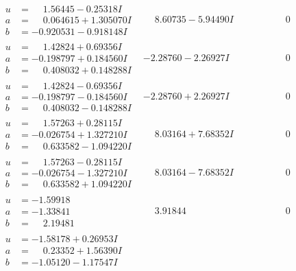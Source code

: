 \documentclass[1p]{elsarticle_modified}
\theoremstyle{definition}
\begin{document}
$$\begin{array}{c|c|c}
\begin{aligned}
u &= \phantom{-}1.56445 - 0.25318 I \\
a &= \phantom{-}0.064615 + 1.305070 I \\
b &= -0.920531 - 0.918148 I\end{aligned}
 & \phantom{-}8.60735 - 5.94490 I & \phantom{-0.000000 } 0 \\ \hline\begin{aligned}
u &= \phantom{-}1.42824 + 0.69356 I \\
a &= -0.198797 + 0.184560 I \\
b &= \phantom{-}0.408032 + 0.148288 I\end{aligned}
 & -2.28760 - 2.26927 I & \phantom{-0.000000 } 0 \\ \hline\begin{aligned}
u &= \phantom{-}1.42824 - 0.69356 I \\
a &= -0.198797 - 0.184560 I \\
b &= \phantom{-}0.408032 - 0.148288 I\end{aligned}
 & -2.28760 + 2.26927 I & \phantom{-0.000000 } 0 \\ \hline\begin{aligned}
u &= \phantom{-}1.57263 + 0.28115 I \\
a &= -0.026754 + 1.327210 I \\
b &= \phantom{-}0.633582 - 1.094220 I\end{aligned}
 & \phantom{-}8.03164 + 7.68352 I & \phantom{-0.000000 } 0 \\ \hline\begin{aligned}
u &= \phantom{-}1.57263 - 0.28115 I \\
a &= -0.026754 - 1.327210 I \\
b &= \phantom{-}0.633582 + 1.094220 I\end{aligned}
 & \phantom{-}8.03164 - 7.68352 I & \phantom{-0.000000 } 0 \\ \hline\begin{aligned}
u &= -1.59918\phantom{ +0.000000I} \\
a &= -1.33841\phantom{ +0.000000I} \\
b &= \phantom{-}2.19481\phantom{ +0.000000I}\end{aligned}
 & \phantom{-}3.91844\phantom{ +0.000000I} & \phantom{-0.000000 } 0 \\ \hline\begin{aligned}
u &= -1.58178 + 0.26953 I \\
a &= \phantom{-}0.23352 + 1.56390 I \\
b &= -1.05120 - 1.17547 I\end{aligned}

\end{array}$$
\end{document}

